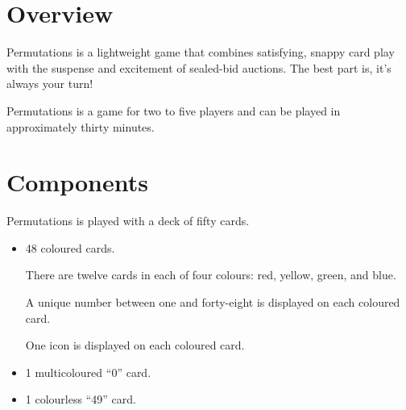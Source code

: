 \documentclass[a6paper, parskip=half, DIV=14, 10pt]{scrartcl}
\begin{document}
\newpage
\setmainfont{Tex Gyre Schola}%
\raggedright%
\section*{Overview}
Permutations is a lightweight game that combines satisfying, snappy card play with the suspense and excitement of sealed-bid auctions. The best part is, it's always your turn!

Permutations is a game for two to five players and can be played in approximately thirty minutes.

\vfill

\section*{Components}
Permutations is played with a deck of fifty cards.
\begin{itemize}[leftmargin=*]
\item 48 coloured cards.

There are twelve cards in each of four colours: red, yellow, green, and blue.

A unique number between one and forty-eight is displayed on each coloured card.

One icon is displayed on each coloured card.
\item 1 multicoloured ``0'' card.
\item 1 colourless ``49'' card.
\end{itemize}

\vfill
\end{document}
